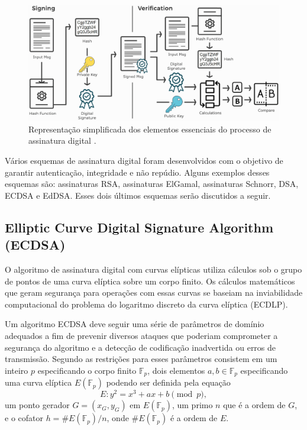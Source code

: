 \begin{figure}[h]
	\centering
	\includegraphics[keepaspectratio=true,scale=0.44]{figuras/assinatura digital.png}
	\caption{Representação simplificada dos elementos essenciais do processo de assinatura digital \cite{nakov2018}.}
	\label{assinaturaDigitalSimp}
\end{figure}

Vários esquemas de assinatura digital foram desenvolvidos com o objetivo de garantir autenticação, integridade e não repúdio. Alguns exemplos desses esquemas são: assinaturas RSA, assinaturas ElGamal, assinaturas Schnorr, DSA, ECDSA e EdDSA. Esses dois últimos esquemas serão discutidos a seguir.

\subsection{Elliptic Curve Digital Signature Algorithm (ECDSA)}

O algoritmo de assinatura digital com curvas elípticas utiliza cálculos sob o grupo de pontos de uma curva elíptica sobre um corpo finito. Os cálculos matemáticos que geram segurança para operações com essas curvas se baseiam na inviabilidade computacional do problema do logaritmo discreto da curva elíptica (ECDLP).

Um algoritmo ECDSA deve seguir uma série de parâmetros de domínio adequados a fim de prevenir diversos ataques que poderiam comprometer a segurança do algoritmo e a detecção de codificação inadvertida ou erros de transmissão. Segundo  as restrições para esses parâmetros consistem em um inteiro $p$ especificando o corpo finito $\mathbb{F}_p$, dois elementos $a, b \in \mathbb{F}_p $ especificando uma curva elíptica $E(\mathbb{F}_p)$ podendo ser definida pela equação
\begin{equation}
E : y^2 = x^3 + ax + b \pmod{p},
\end{equation}
um ponto gerador $G = (x_G, y_G)$ em $E(\mathbb{F}_p)$, um primo $n$ que é a ordem de $G$, e o cofator $h = \#E(\mathbb{F}_p) / n$, onde $\#E(\mathbb{F}_p)$ é a ordem de $E$.


